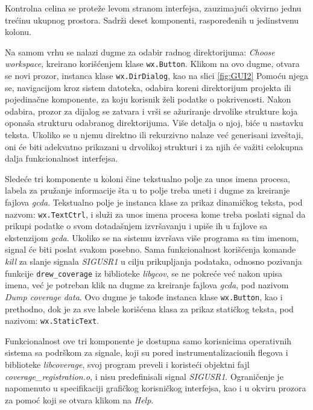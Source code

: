 \documentclass[12pt,oneside]{memoir}
\newcommand{\kod}[1]{\texttt{#1}}
\newcommand{\strano}[1]{\textit{#1}}
\begin{document}
Kontrolna celina se proteže levom stranom interfejsa, zauzimajući okvirno jednu trećinu ukupnog prostora. Sadrži deset komponenti, raspoređenih u jedinstvenu kolonu. 

Na samom vrhu se nalazi dugme za odabir radnog direktorijuma: \strano{Choose workspace}, kreirano korišćenjem klase \kod{wx.Button}. Klikom na ovo dugme, otvara se novi prozor, instanca klase \kod{wx.DirDialog}, kao na slici \ref{fig:GUI2} Pomoću njega se, navigacijom kroz sistem datoteka, odabira koreni direktorijum projekta ili pojedinačne komponente, za koju korisnik želi podatke o pokrivenosti. Nakon odabira, prozor za dijalog se zatvara i vrši se ažuriranje drvolike strukture koja oponaša strukturu odabranog direktorijuma. Više detalja o njoj, biće u nastavku teksta. Ukoliko se u njemu direktno ili rekurzivno nalaze već generisani izveštaji, oni će biti adekvatno prikazani u drvolikoj strukturi i za njih će važiti celokupna dalja funkcionalnost interfejsa. 

Sledeće tri komponente u koloni čine tekstualno polje za unos imena procesa, labela za pružanje informacije šta u to polje treba uneti i dugme za kreiranje fajlova \strano{gcda}. Tekstualno polje je instanca klase za prikaz dinamičkog teksta, pod nazvom: \kod{wx.TextCtrl}, i služi za unos imena procesa kome treba poslati signal da prikupi podatke o svom dotadašnjem izvršavanju i upiše ih u fajlove sa ekstenzijom \strano{gcda}. Ukoliko se na sistemu izvršava više programa sa tim imenom, signal će biti poslat svakom posebno. Sama funkcionalnost korišćenja komande \strano{kill} za slanje signala \strano{SIGUSR1} u cilju prikupljanja podataka, odnosno pozivanja funkcije \kod{drew\_coverage} iz biblioteke \strano{libgcov}, se ne pokreće već nakon upisa imena, već je potreban klik na dugme za kreiranje fajlova \strano{gcda}, pod nazivom \strano{Dump coverage data}. Ovo dugme je takođe instanca klase \kod{wx.Button}, kao i prethodno, dok je za sve labele korišćena klasa za prikaz statičkog teksta, pod nazivom: \kod{wx.StaticText}. 


Funkcionalnost ove tri komponente je dostupna samo korisnicima operativnih sistema sa podrškom za signale, koji su pored instrumentalizacionih flegova i biblioteke \strano{libcoverage}, svoj program preveli i koristeći objektni fajl \strano{coverage\_registration.o}, i nisu predefinisali signal \strano{SIGUSR1}. Ograničenje je napomenuto u specifikaciji grafičkog korisničkog interfejsa, kao i u okviru prozora za pomoć koji se otvara klikom na \strano{Help}. 
\end{document}
